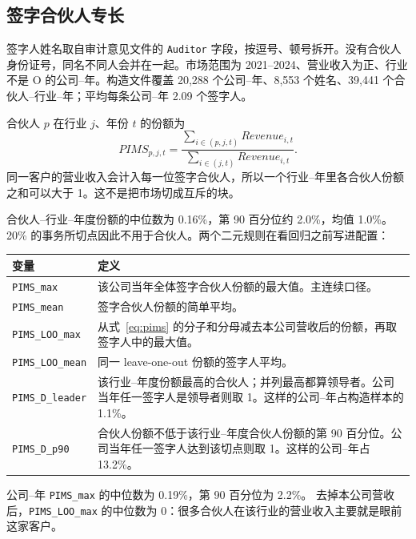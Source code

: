 \documentclass[11pt]{article}
\begin{document}
\subsection{签字合伙人专长}

签字人姓名取自审计意见文件的 \texttt{Auditor} 字段，按逗号、顿号拆开。没有合伙人身份证号，同名不同人会并在一起。市场范围为 2021--2024、营业收入为正、行业不是 O 的公司--年。构造文件覆盖 20,288 个公司--年、8,553 个姓名、39,441 个合伙人--行业--年；平均每条公司--年 2.09 个签字人。

合伙人 \(p\) 在行业 \(j\)、年份 \(t\) 的份额为
\begin{equation}
PIMS_{p,j,t}=\frac{\sum_{i\in(p,j,t)}Revenue_{i,t}}{\sum_{i\in(j,t)}Revenue_{i,t}}.
\label{eq:pims}
\end{equation}
同一客户的营业收入会计入每一位签字合伙人，所以一个行业--年里各合伙人份额之和可以大于 1。这不是把市场切成互斥的块。

合伙人--行业--年度份额的中位数为 0.16\%，第 90 百分位约 2.0\%，均值 1.0\%。20\% 的事务所切点因此不用于合伙人。两个二元规则在看回归之前写进配置：

\begin{center}
\begin{threeparttable}
\caption{合伙人指标：先在合伙人--行业--年上定义，再汇总到公司--年}
\label{tab:pims-def}
\begin{tabular}{lp{10.2cm}}
\toprule
变量 & 定义 \\
\midrule
\texttt{PIMS\_max} & 该公司当年全体签字合伙人份额的最大值。主连续口径。 \\
\texttt{PIMS\_mean} & 签字合伙人份额的简单平均。 \\
\texttt{PIMS\_LOO\_max} & 从式~\eqref{eq:pims} 的分子和分母减去本公司营收后的份额，再取签字人中的最大值。 \\
\texttt{PIMS\_LOO\_mean} & 同一 leave-one-out 份额的签字人平均。 \\
\texttt{PIMS\_D\_leader} & 该行业--年度份额最高的合伙人；并列最高都算领导者。公司当年任一签字人是领导者则取 1。这样的公司--年占构造样本的 1.1\%。 \\
\texttt{PIMS\_D\_p90} & 合伙人份额不低于该行业--年度合伙人份额的第 90 百分位。公司当年任一签字人达到该切点则取 1。这样的公司--年占 13.2\%。 \\
\bottomrule
\end{tabular}
\end{threeparttable}
\end{center}

公司--年 \texttt{PIMS\_max} 的中位数为 0.19\%，第 90 百分位为 2.2\%。
去掉本公司营收后，\texttt{PIMS\_LOO\_max} 的中位数为 0：很多合伙人在该行业的营业收入主要就是眼前这家客户。
\end{document}
